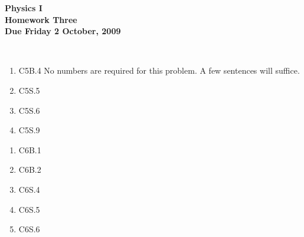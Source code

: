 \documentclass[12pt]{article}
\begin{document}
\pagestyle{empty}
 
\begin{center}
{\large {\bf Physics I}}\\
\medskip
{\large {\bf Homework Three}}\\
\medskip
{ {\bf Due Friday 2 October, 2009}}\\
\end{center}

\hspace{2mm}\\


\begin{enumerate}
\setlength{\itemsep}{-1mm}
  \item C5B.4 No numbers are required for this problem.  A few 
  sentences will suffice.
  \item C5S.5
  \item C5S.6
  \item C5S.9
\end{enumerate}



\begin{enumerate}
\setlength{\itemsep}{-1mm}
  \item C6B.1
  \item C6B.2
  \item C6S.4
  \item C6S.5
  \item C6S.6
\end{enumerate}
\end{document}
